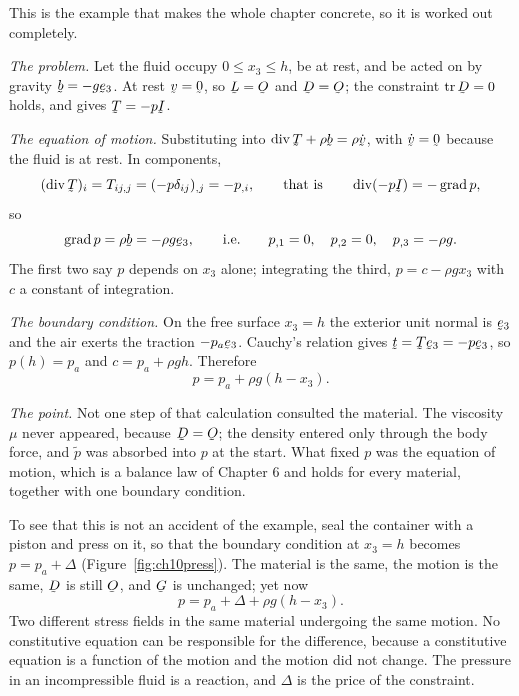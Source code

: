 \begin{example}\label{ex:ch10hydro}
This is the example that makes the whole chapter concrete, so it is
worked out completely.

\emph{The problem.} Let the fluid occupy $0\leq x_{3}\leq h$, be at rest,
and be acted on by gravity $\bb=-g\be_{3}$. At rest $\bv=\bze$, so
$\bL=\Ob$ and $\bD=\Ob$; the constraint $\tr\bD=0$ holds, and
 gives $\bT=-p\I$.

\emph{The equation of motion.} Substituting into
$\dvg\bT+\rho\bb=\rho\dot\bv$, with $\dot\bv=\bze$ because the fluid is
at rest. In components,
\[
   (\dvg\bT)_{i}=T_{ij,j}=(-p\dd_{ij})_{,j}=-p_{,i},
   \qquad\text{that is}\qquad \dvg(-p\I)=-\grad p ,
\]
so
\[
   \grad p=\rho\bb=-\rho g\be_{3},
   \qquad\text{i.e.}\qquad
   p_{,1}=0,\quad p_{,2}=0,\quad p_{,3}=-\rho g .
\]
The first two say $p$ depends on $x_{3}$ alone; integrating the third,
$p=c-\rho gx_{3}$ with $c$ a constant of integration.

\emph{The boundary condition.} On the free surface $x_{3}=h$ the exterior
unit normal is $\be_{3}$ and the air exerts the traction $-p_{a}\be_{3}$.
Cauchy's relation gives $\bt=\bT\be_{3}=-p\be_{3}$, so $p(h)=p_{a}$ and
$c=p_{a}+\rho gh$. Therefore
\[
   \boxed{\ p=p_{a}+\rho g(h-x_{3}).\ }
\]

\emph{The point.} Not one step of that calculation consulted the
material. The viscosity $\mu$ never appeared, because $\bD=\Ob$; the
density entered only through the body force, and $\tilde p$ was absorbed
into $p$ at the start. What fixed $p$ was the equation of motion, which
is a balance law of Chapter 6 and holds for every material, together with
one boundary condition.

To see that this is not an accident of the example, seal the container
with a piston and press on it, so that the boundary condition at
$x_{3}=h$ becomes $p=p_{a}+\Delta$ (Figure~\ref{fig:ch10press}). The
material is the same, the motion is the same, $\bD$ is still $\Ob$, and
$\bG$ is unchanged; yet now
\[
   p=p_{a}+\Delta+\rho g(h-x_{3}).
\]
Two different stress fields in the same material undergoing the same
motion. No constitutive equation can be responsible for the difference,
because a constitutive equation is a function of the motion and the
motion did not change. The pressure in an incompressible fluid is a
reaction, and $\Delta$ is the price of the constraint.


\end{example}
